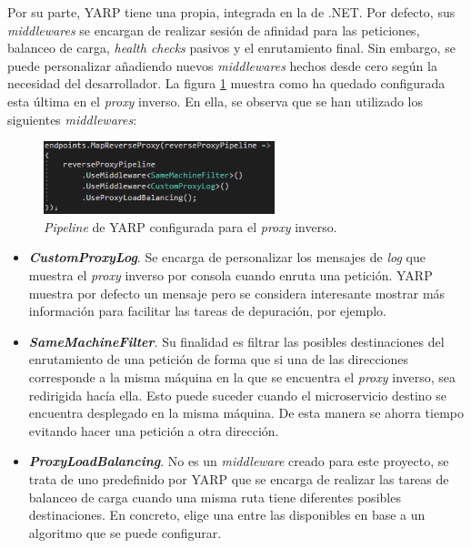 \documentclass[11pt,spanish,listoffigures]{tfgetsinf}
\begin{document}
Por su parte, YARP tiene una propia, integrada en la de .NET. Por defecto, sus \emph{middlewares} se encargan de realizar sesión de afinidad para las peticiones, balanceo de carga, \emph{health checks} pasivos y el enrutamiento final. Sin embargo, se puede personalizar añadiendo nuevos \emph{middlewares} hechos desde cero según la necesidad del desarrollador. La figura \ref{pipelineYARP_imagen} muestra como ha quedado configurada esta última en el \emph{proxy} inverso. En ella, se observa que se han utilizado los siguientes \emph{middlewares}:

\begin{figure}[ht]
\centering
\includegraphics[width=0.6\textwidth]{imagenes/pipelineYARP}
\caption{\emph{Pipeline} de YARP configurada para el \emph{proxy} inverso.}
	\label{pipelineYARP_imagen}
\end{figure}

\begin{itemize}

	\item \textbf{\emph{CustomProxyLog}}. Se encarga de personalizar los mensajes de \emph{log} que muestra el \emph{proxy} inverso por consola cuando enruta una petición. YARP muestra por defecto un mensaje pero se considera interesante mostrar más información para facilitar las tareas de depuración, por ejemplo.

	\item \textbf{\emph{SameMachineFilter}}. Su finalidad es filtrar las posibles destinaciones del enrutamiento de una petición de forma que si una de las direcciones corresponde a la misma máquina en la que se encuentra el \emph{proxy} inverso, sea redirigida hacía ella. Esto puede suceder cuando el microservicio destino se encuentra desplegado en la misma máquina. De esta manera se ahorra tiempo evitando hacer una petición a otra dirección.

	\item \textbf{\emph{ProxyLoadBalancing}}. No es un \emph{middleware} creado para este proyecto, se trata de uno predefinido por YARP que se encarga de realizar las tareas de balanceo de carga cuando una misma ruta tiene diferentes posibles destinaciones. En concreto, elige una entre las disponibles en base a un algoritmo que se puede configurar.

\end{itemize}
\end{document}
